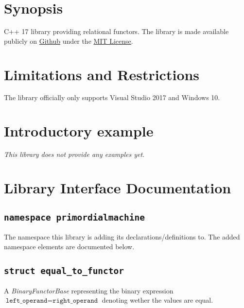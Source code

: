 \documentclass[oneside]{book}
\begin{document}
\frontmatter

\begin{titlepage}
\maketitle
\end{titlepage}

\tableofcontents
{}

\mainmatter

\chapter{Synopsis}
C++ 17 library providing relational functors.
The library is made available publicly on
\href{\GetLibraryRepository}{Github}
under the
\href{\GetLibraryRepository/blob/master/LICENSE}{MIT License}.

\chapter{Limitations and Restrictions}
The library officially only supports Visual Studio 2017 and Windows 10.

\chapter{Introductory example}
\textit{\color{orange}This library does not provide any examples yet.}



\chapter{Library Interface Documentation}

\section{\texttt{namespace primordialmachine}}
The namespace this library is adding its declarations/definitions to.
The added namespace elements are documented below.



\section{\texttt{struct equal\_to\_functor}}
A \textit{BinaryFunctorBase} representing the binary expression
$\texttt{left\_operand} = \texttt{right\_operand}$
denoting wether the values are equal.\newline
\end{document}
